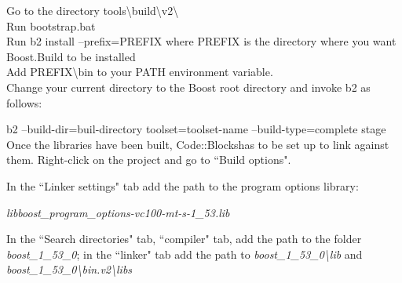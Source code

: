 \documentclass[12pt,a4paper]{report}
\begin{document}
Go to the directory tools\textbackslash build\textbackslash v2\textbackslash \\

Run bootstrap.bat\\


Run b2 install --prefix=PREFIX where PREFIX is the directory where you want Boost.Build to be installed\\


Add PREFIX\textbackslash bin to your PATH environment variable.\\


Change your current directory to the Boost root directory and invoke b2 as follows:

b2 --build-dir=buil-directory toolset=toolset-name --build-type=complete stage\\

Once the libraries have been built, Code::Blockshas to be set up to link against them. Right-click on the project and go to ``Build options".

In the ``Linker settings" tab add the path to the program options library:

\emph{libboost\_program\_options-vc100-mt-s-1\_53.lib}

In the ``Search directories" tab, ``compiler" tab, add the path to the folder \emph{boost\_1\_53\_0}; in the ``linker" tab add the path to \emph{boost\_1\_53\_0\textbackslash lib} and \emph{boost\_1\_53\_0\textbackslash bin.v2\textbackslash libs}
\end{document}
